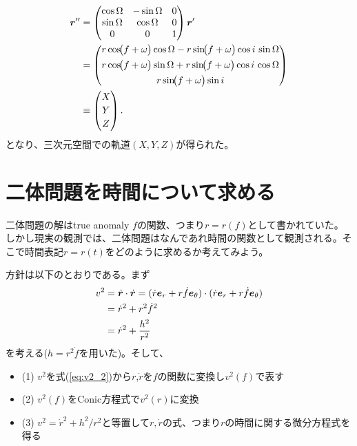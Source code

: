 \begin{align}
\boldsymbol{r}^{\prime\prime} &=
\begin{pmatrix}
\cos\Omega & -\sin\Omega & 0\\
\sin\Omega &  \cos\Omega & 0\\
0          &  0          & 1
\end{pmatrix}
\boldsymbol{r}^\prime \\
&=
\begin{pmatrix}
r\cos\!\bigl(f+\omega\bigr)\cos\Omega
 - r\sin\!\bigl(f+\omega\bigr)\cos i\,\sin\Omega\\[4pt]
r\cos\!\bigl(f+\omega\bigr)\sin\Omega
 + r\sin\!\bigl(f+\omega\bigr)\cos i\,\cos\Omega\\[4pt]
r\sin\!\bigl(f+\omega\bigr)\sin i
\end{pmatrix}
\\
\label{eq:threed}
&\equiv
\begin{pmatrix}
X\\[2pt] Y\\[2pt] Z
\end{pmatrix}.
\end{align}
となり、三次元空間での軌道$(X,Y,Z)$が得られた。

\section{二体問題を時間について求める}
二体問題の解はtrue anomaly $f$の関数、つまり$r = r(f)$として書かれていた。しかし現実の観測では、二体問題はなんであれ時間の関数として観測される。そこで時間表記$r = r(t)$をどのように求めるか考えてみよう。

方針は以下のとおりである。まず
\begin{align}
        v^2 &= \dot{\boldsymbol{r}} \cdot \dot{\boldsymbol{r}} 
        = (\dot{r} {\boldsymbol{e}}_r + r \dot{f} {\boldsymbol{e}}_\theta) \cdot (\dot{r} {\boldsymbol{e}}_r + r \dot{f} {\boldsymbol{e}}_\theta) \nonumber \\
        \label{eq:v2_1}
        &= \dot{r}^2 + r^2 \dot{f}^2 \\
        \label{eq:v2_2}
        &=  \dot{r}^2 + \frac{h^2}{r^2} 
\end{align}
を考える($h = r^2 \dot{f}$を用いた)。そして、
\begin{itemize}
    \item (1) $v^2$を式(\ref{eq:v2_2})から$r$,$\dot{r}$を$f$の関数に変換し$v^2 (f)$で表す
    \item (2) $v^2(f)$をConic方程式で$v^2(r)$に変換
    \item (3) $v^2 = \dot{r}^2 + h^2/r^2$と等置して$r, \dot{r}$の式、つまり$r$の時間に関する微分方程式を得る
\end{itemize}

